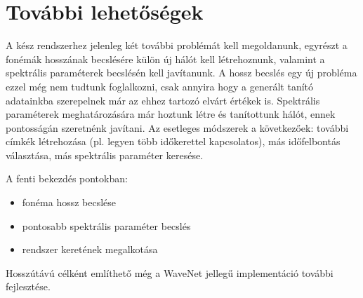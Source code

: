 \section{További lehetőségek}

A kész rendszerhez jelenleg két további problémát kell megoldanunk, egyrészt a fonémák hosszának becslésére külön új hálót kell létrehoznunk, valamint a spektrális paraméterek becslésén kell javítanunk. A hossz becslés egy új probléma ezzel még nem tudtunk foglalkozni, csak annyira hogy a generált tanító adatainkba szerepelnek már az ehhez tartozó elvárt értékek is. Spektrális paraméterek meghatározására már hoztunk létre és tanítottunk hálót, ennek pontosságán szeretnénk javítani. Az esetleges módszerek a következőek: további címkék létrehozása (pl. legyen több időkerettel kapcsolatos), más időfelbontás választása, más spektrális paraméter keresése.

A fenti bekezdés pontokban:

\begin{itemize}
	\item fonéma hossz becslése
	\item pontosabb spektrális paraméter becslés
	\item rendszer keretének megalkotása
\end{itemize}

Hosszútávú célként említhető még a WaveNet jellegű implementáció további fejlesztése.